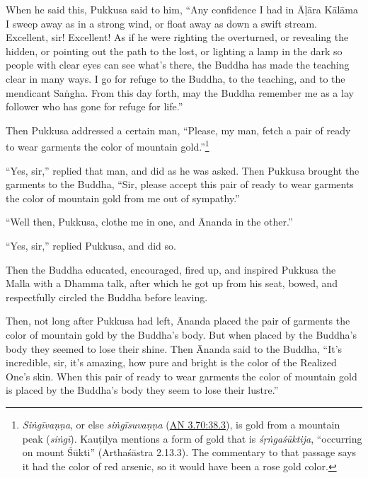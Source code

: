 \documentclass[12pt,openany]{book}%
\begin{document}
When he said this, Pukkusa said to him, “Any confidence I had in \textsanskrit{Āḷāra} \textsanskrit{Kālāma} I sweep away as in a strong wind, or float away as down a swift stream. Excellent, sir! Excellent! As if he were righting the overturned, or revealing the hidden, or pointing out the path to the lost, or lighting a lamp in the dark so people with clear eyes can see what’s there, the Buddha has made the teaching clear in many ways. I go for refuge to the Buddha, to the teaching, and to the mendicant \textsanskrit{Saṅgha}. From this day forth, may the Buddha remember me as a lay follower who has gone for refuge for life.” 

Then Pukkusa addressed a certain man, “Please, my man, fetch a pair of ready to wear garments the color of mountain gold.”\footnote{\textit{\textsanskrit{Siṅgīvaṇṇa}}, or else \textit{\textsanskrit{siṅgīsuvaṇṇa}} (\href{https://suttacentral.net/an3.70/en/sujato\#38.3}{AN 3.70:38.3}), is gold from a mountain peak (\textit{\textsanskrit{siṅgī}}). \textsanskrit{Kauṭilya} mentions a form of gold that is \textit{\textsanskrit{śṛṅgaśūktija}}, “occurring on mount \textsanskrit{Śūkti}” (\textsanskrit{Arthaśāstra} 2.13.3). The commentary to that passage says it had the color of red arsenic, so it would have been a rose gold color. } 

“Yes, sir,” replied that man, and did as he was asked. Then Pukkusa brought the garments to the Buddha, “Sir, please accept this pair of ready to wear garments the color of mountain gold from me out of sympathy.” 

“Well then, Pukkusa, clothe me in one, and Ānanda in the other.” 

“Yes, sir,” replied Pukkusa, and did so. 

Then the Buddha educated, encouraged, fired up, and inspired Pukkusa the Malla with a Dhamma talk, after which he got up from his seat, bowed, and respectfully circled the Buddha before leaving. 

Then, not long after Pukkusa had left, Ānanda placed the pair of garments the color of mountain gold by the Buddha’s body. But when placed by the Buddha’s body they seemed to lose their shine. Then Ānanda said to the Buddha, “It’s incredible, sir, it’s amazing, how pure and bright is the color of the Realized One’s skin. When this pair of ready to wear garments  the color of mountain gold is placed by the Buddha’s body they seem to lose their lustre.” 
\end{document}

